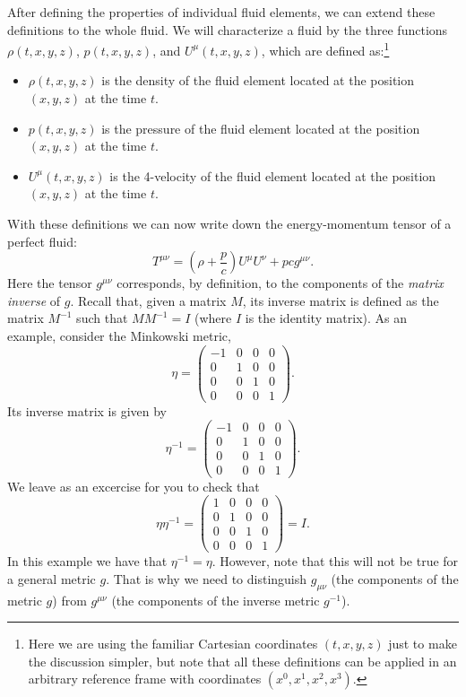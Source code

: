 \documentclass[11pt, a4paper,oneside,openright]{book}
\numberwithin{equation}{section}
\begin{document}
After defining the properties of individual fluid elements, we can extend these definitions to the whole fluid. We will characterize a fluid by the three functions $\rho(t,x,y,z)$, $p(t,x,y,z)$, and $U^{\mu}(t,x,y,z)$, which are defined as:\footnote{Here we are using the familiar Cartesian coordinates $(t,x,y,z)$ just to make the discussion simpler, but note that all these definitions can be applied in an arbitrary reference frame with coordinates $(x^0,x^1,x^2,x^3)$.}
\begin{itemize}
\item $\rho(t,x,y,z)$ is the density of the fluid element located at the position $(x,y,z)$ at the time $t$.
\item $p(t,x,y,z)$ is the pressure of the fluid element located at the position $(x,y,z)$ at the time $t$.
\item $U^{\mu}(t,x,y,z)$ is the 4-velocity of the fluid element located at the position $(x,y,z)$ at the time $t$.
\end{itemize}
With these definitions we can now write down the energy-momentum tensor of a perfect fluid:
\begin{equation} \label{eq:perfect_fluid_tmunu}
T^{\mu\nu}=\left(\rho+\frac{p}{c}\right)U^{\mu}U^{\nu}+pcg^{\mu\nu}.
\end{equation}
Here the tensor $g^{\mu\nu}$ corresponds, by definition, to the components of the {\it matrix inverse} of $g$. Recall that, given a matrix $M$, its inverse matrix is defined as the matrix $M^{-1}$ such that $MM^{-1}=I$ (where $I$ is the identity matrix). As an example, consider the Minkowski metric,
\begin{equation}
\eta=\left( \begin{array}{cccc} -1 & 0 & 0 & 0 \\ 
0 & 1 & 0 & 0 \\
0 & 0 & 1 & 0 \\
0 & 0 & 0 & 1\end{array} \right).
\end{equation}
Its inverse matrix is given by
\begin{equation}
\eta^{-1}=\left( \begin{array}{cccc} -1 & 0 & 0 & 0 \\ 
0 & 1 & 0 & 0 \\
0 & 0 & 1 & 0 \\
0 & 0 & 0 & 1\end{array} \right).
\end{equation}
We leave as an excercise for you to check that
\begin{equation}
\eta\eta^{-1}=\left( \begin{array}{cccc} 1 & 0 & 0 & 0 \\ 
0 & 1 & 0 & 0 \\
0 & 0 & 1 & 0 \\
0 & 0 & 0 & 1\end{array} \right)=I.
\end{equation}
In this example we have that $\eta^{-1}=\eta$. However, note that this will not be true for a general metric $g$. That is why we need to distinguish $g_{\mu\nu}$ (the components of the metric $g$) from $g^{\mu\nu}$ (the components of the inverse metric $g^{-1}$).
\end{document}
